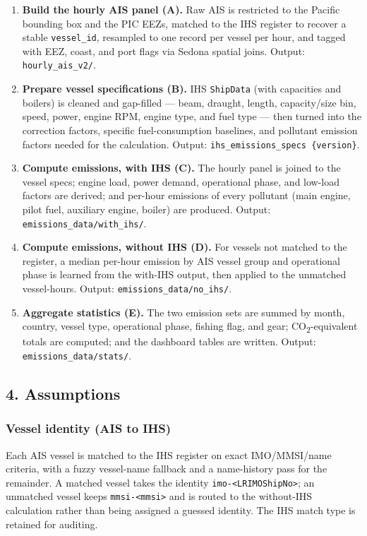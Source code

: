 \documentclass[
  11pt,
]{article}
\begin{document}
\begin{enumerate}
\item
  \textbf{Build the hourly AIS panel (A).} Raw AIS is restricted to the
  Pacific bounding box and the PIC EEZs, matched to the IHS register to
  recover a stable \texttt{vessel\_id}, resampled to one record per
  vessel per hour, and tagged with EEZ, coast, and port flags via Sedona
  spatial joins. Output: \texttt{hourly\_ais\_v2/}.
\item
  \textbf{Prepare vessel specifications (B).} IHS \texttt{ShipData} (with
  capacities and boilers) is cleaned and gap-filled --- beam, draught,
  length, capacity/size bin, speed, power, engine RPM, engine type, and
  fuel type --- then turned into the correction factors, specific
  fuel-consumption baselines, and pollutant emission factors needed for
  the calculation. Output: \texttt{ihs\_emissions\_specs\ \{version\}}.
\item
  \textbf{Compute emissions, with IHS (C).} The hourly panel is joined to
  the vessel specs; engine load, power demand, operational phase, and
  low-load factors are derived; and per-hour emissions of every pollutant
  (main engine, pilot fuel, auxiliary engine, boiler) are produced.
  Output: \texttt{emissions\_data/with\_ihs/}.
\item
  \textbf{Compute emissions, without IHS (D).} For vessels not matched to
  the register, a median per-hour emission by AIS vessel group and
  operational phase is learned from the with-IHS output, then applied to
  the unmatched vessel-hours. Output: \texttt{emissions\_data/no\_ihs/}.
\item
  \textbf{Aggregate statistics (E).} The two emission sets are summed by
  month, country, vessel type, operational phase, fishing flag, and gear;
  CO\textsubscript{2}-equivalent totals are computed; and the dashboard
  tables are written. Output: \texttt{emissions\_data/stats/}.
\end{enumerate}

\subsection{4. Assumptions}\label{assumptions}

\subsubsection{Vessel identity (AIS to
IHS)}\label{vessel-identity}

Each AIS vessel is matched to the IHS register on exact IMO/MMSI/name
criteria, with a fuzzy vessel-name fallback and a name-history pass for
the remainder. A matched vessel takes the identity
\texttt{imo-\textless{}LRIMOShipNo\textgreater{}}; an unmatched vessel
keeps \texttt{mmsi-\textless{}mmsi\textgreater{}} and is routed to the
without-IHS calculation rather than being assigned a guessed identity.
The IHS match type is retained for auditing.
\end{document}
